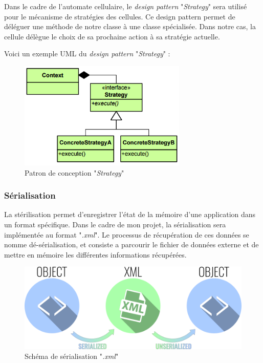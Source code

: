 \documentclass[a4paper]{article}
\begin{document}
Dans le cadre de l'automate cellulaire, le \textit{design pattern} "\textit{Strategy}" sera utilisé pour le mécanisme de stratégies des cellules. Ce design pattern permet de déléguer une méthode de notre classe à une classe spécialisée. Dans notre cas, la cellule délègue le choix de sa prochaine action à sa stratégie actuelle.

Voici un exemple UML du \textit{design pattern} "\textit{Strategy}" :

\begin{figure}[htp]
    \centering
    \includegraphics[width=8cm]{strategy.png}
    \caption{Patron de conception "\textit{Strategy}"}
\end{figure}

\subsubsection{Sérialisation}
La stérilisation permet d'enregistrer l'état de la mémoire d'une application dans un format spécifique. Dans le cadre de mon projet, la sérialisation sera implémentée au format "\textit{.xml}". Le processus de récupération de ces données se nomme dé-sérialisation, et consiste a parcourir le fichier de données externe et de mettre en mémoire les différentes informations récupérées.

\vfill
\begin{figure}[htp]
    \centering
    \includegraphics[width=\linewidth - 2cm]{serialization.png}
    \caption{Schéma de sérialisation "\textit{.xml}"}
\end{figure}
\vfill
\end{document}
